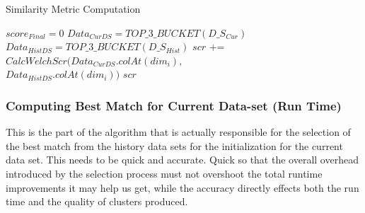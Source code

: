 \documentclass{vldb}
\begin{document}

\begin{algorithm}
\caption{Similarity Metric Computation}
\label{similarity_computation}
\fontsize{10}{15}
\begin{algorithmic}[1]
\State $score_{Final} = 0$
\State $Data_{CurDS} = TOP\_3\_BUCKET(D\_S_{Cur})$
\State $Data_{HistDS} = TOP\_3\_BUCKET(D\_S_{Hist})$
	\State $scr$ += $CalcWelchScr(Data_{CurDS}.colAt(dim_i),$\\
	\State $Data_{HistDS}.colAt(dim_i))$
\EndFor
\State\Return $scr$
\EndProcedure
\end{algorithmic}
\end{algorithm}


\subsubsection{Computing Best Match for Current Data-set (Run Time)}
This is the part of the algorithm that is actually responsible for the selection of the best match from the history data sets for the initialization for the current data set. This needs to be quick and accurate. Quick so that the overall overhead introduced by the selection process must not overshoot the total runtime improvements it may help us get, while the accuracy directly effects both the run time and the quality of clusters produced.
\end{document}
